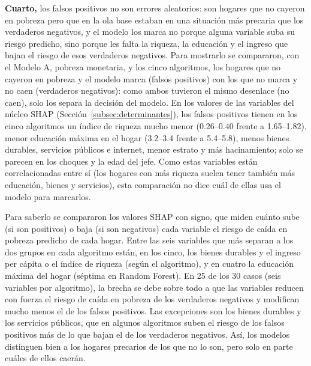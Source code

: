 \documentclass[12pt, letterpaper]{article}
\begin{document}


\textbf{Cuarto,} los falsos positivos no son errores aleatorios: son hogares
que no cayeron en pobreza pero que en la ola base estaban en una situación más precaria
que los verdaderos negativos, y el modelo los marca no
porque alguna variable suba su riesgo predicho, sino porque les falta
la riqueza, la educación y el ingreso que bajan el riesgo de esos
verdaderos negativos. Para mostrarlo se compararon, con el Modelo A,
pobreza monetaria, y los cinco algoritmos, los hogares que no cayeron en pobreza 
y el modelo marca
(falsos positivos) con los que no marca y no caen (verdaderos negativos): como ambos
tuvieron el mismo desenlace (no caen), solo los separa la decisión del modelo.
En los valores de las variables del núcleo SHAP
(Sección~\ref{subsec:determinantes}), los falsos
positivos tienen en los cinco algoritmos un índice de riqueza mucho menor
(0.26--0.40 frente a 1.65--1.82), menor educación máxima en el hogar
(3.2--3.4 frente a 5.4--5.8), menos bienes durables, servicios públicos e
internet, menor estrato y más hacinamiento; solo se parecen en los choques
y la edad del jefe. Como estas variables están correlacionadas entre sí 
(los hogares con más riqueza suelen tener también más educación, 
bienes y servicios), esta comparación no dice cuál de ellas usa el modelo para marcarlos.

Para saberlo se compararon los valores SHAP con signo, que miden
cuánto sube (si son positivos) o baja (si son negativos) cada variable el
riesgo de caída en pobreza predicho de cada hogar. Entre las seis variables que más separan a
los dos grupos en cada algoritmo están, en los cinco, los bienes durables
y el ingreso per cápita o el índice de riqueza (según el algoritmo), y en
cuatro la educación máxima del hogar (séptima en Random Forest). En 25 de los
30 casos (seis variables por algoritmo), la brecha se debe sobre todo a
que las variables reducen con fuerza el riesgo de caída en pobreza de los verdaderos negativos y
modifican mucho menos el de los falsos positivos. Las excepciones son los
bienes durables y los servicios públicos, que en algunos algoritmos suben
el riesgo de los falsos positivos más de lo que bajan el de los
verdaderos negativos. Así, los modelos distinguen bien a los hogares
precarios de los que no lo son, pero solo en parte cuáles de ellos
caerán.
\end{document}
